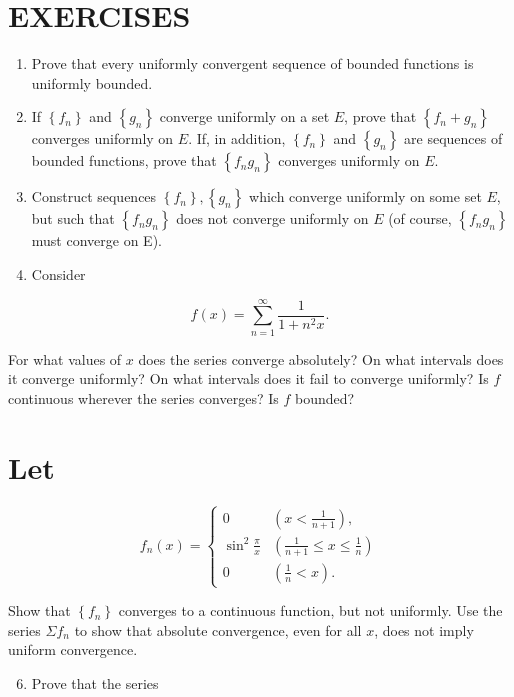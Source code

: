\documentclass[10pt]{article}
\begin{document}
\section{EXERCISES}
\begin{enumerate}
  \item Prove that every uniformly convergent sequence of bounded functions is uniformly bounded.

  \item If $\left\{f_{n}\right\}$ and $\left\{g_{n}\right\}$ converge uniformly on a set $E$, prove that $\left\{f_{n}+g_{n}\right\}$ converges uniformly on $E$. If, in addition, $\left\{f_{n}\right\}$ and $\left\{g_{n}\right\}$ are sequences of bounded functions, prove that $\left\{f_{n} g_{n}\right\}$ converges uniformly on $E$.

  \item Construct sequences $\left\{f_{n}\right\},\left\{g_{n}\right\}$ which converge uniformly on some set $E$, but such that $\left\{f_{n} g_{n}\right\}$ does not converge uniformly on $E$ (of course, $\left\{f_{n} g_{n}\right\}$ must converge on E).

  \item Consider

\end{enumerate}

$$
f(x)=\sum_{n=1}^{\infty} \frac{1}{1+n^{2} x} .
$$

For what values of $x$ does the series converge absolutely? On what intervals does it converge uniformly? On what intervals does it fail to converge uniformly? Is $f$ continuous wherever the series converges? Is $f$ bounded?

\section{Let}
$$
f_{n}(x)= \begin{cases}0 & \left(x<\frac{1}{n+1}\right), \\ \sin ^{2} \frac{\pi}{x} & \left(\frac{1}{n+1} \leq x \leq \frac{1}{n}\right) \\ 0 & \left(\frac{1}{n}<x\right) .\end{cases}
$$

Show that $\left\{f_{n}\right\}$ converges to a continuous function, but not uniformly. Use the series $\Sigma f_{n}$ to show that absolute convergence, even for all $x$, does not imply uniform convergence.

\begin{enumerate}
  \setcounter{enumi}{5}
  \item Prove that the series
\end{enumerate}
\end{document}
